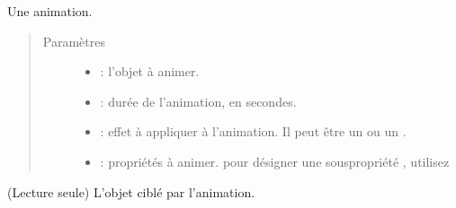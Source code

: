 \documentclass[letterpaper,10pt,french]{sphinxmanual}
\begin{document}
\begin{fulllineitems}
\label{\detokenize{animation:pygame_animations.Animation}}
\sphinxAtStartPar
Une animation.
\begin{quote}\begin{description}
\item[{Paramètres}] \leavevmode\begin{itemize}
\item {} 
\sphinxAtStartPar
{} : l’objet à animer.

\item {} 
\sphinxAtStartPar
{} : durée de l’animation, en secondes.

\item {} 
\sphinxAtStartPar
{} : effet à appliquer à l’animation. Il peut être un {\hyperref[\detokenize{effects:nativeeffects}]{}} ou un {\hyperref[\detokenize{effects:customeffects}]{}}.

\item {} 
\sphinxAtStartPar
{} : propriétés à animer. pour désigner une sous\sphinxhyphen{}propriété , utilisez 

\end{itemize}

\end{description}\end{quote}

\begin{fulllineitems}
\label{\detokenize{animation:pygame_animations.Animation.target}}
\sphinxAtStartPar
(Lecture seule) L’objet ciblé par l’animation.

\end{fulllineitems}



\end{fulllineitems}
\end{document}
